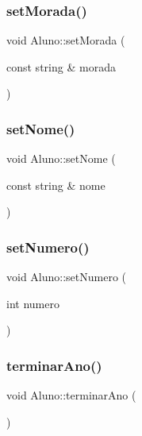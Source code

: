 \hypertarget{class_aluno_aa96c2e587fd84faa59864a50cd8393ec}{}\label{class_aluno_aa96c2e587fd84faa59864a50cd8393ec} 
\subsubsection{\texorpdfstring{set\+Morada()}{setMorada()}}
{\footnotesize\ttfamily void Aluno\+::set\+Morada (\begin{DoxyParamCaption}\item[{const string \&}]{morada }\end{DoxyParamCaption})}

\hypertarget{class_aluno_a67c455668824da3badaeb3a2eb2c8c4d}{}\label{class_aluno_a67c455668824da3badaeb3a2eb2c8c4d} 
\subsubsection{\texorpdfstring{set\+Nome()}{setNome()}}
{\footnotesize\ttfamily void Aluno\+::set\+Nome (\begin{DoxyParamCaption}\item[{const string \&}]{nome }\end{DoxyParamCaption})}

\hypertarget{class_aluno_a36ad83483a9e0c247d7092a95607758c}{}\label{class_aluno_a36ad83483a9e0c247d7092a95607758c} 
\subsubsection{\texorpdfstring{set\+Numero()}{setNumero()}}
{\footnotesize\ttfamily void Aluno\+::set\+Numero (\begin{DoxyParamCaption}\item[{int}]{numero }\end{DoxyParamCaption})}

\hypertarget{class_aluno_a541c17d0c9a626c132153936dc6065f5}{}\label{class_aluno_a541c17d0c9a626c132153936dc6065f5} 
\subsubsection{\texorpdfstring{terminar\+Ano()}{terminarAno()}}
{\footnotesize\ttfamily void Aluno\+::terminar\+Ano (\begin{DoxyParamCaption}{ }\end{DoxyParamCaption})}




